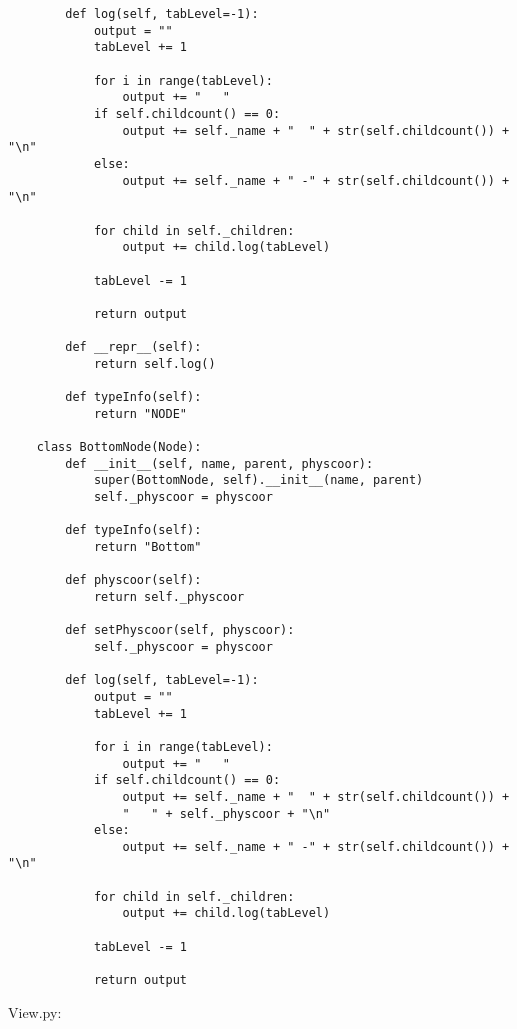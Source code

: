 \begin{verbatim}
        def log(self, tabLevel=-1):
            output = ""
            tabLevel += 1
    
            for i in range(tabLevel):
                output += "   "
            if self.childcount() == 0:
                output += self._name + "  " + str(self.childcount()) + "\n"
            else:
                output += self._name + " -" + str(self.childcount()) + "\n"
    
            for child in self._children:
                output += child.log(tabLevel)
    
            tabLevel -= 1
    
            return output
    
        def __repr__(self):
            return self.log()
    
        def typeInfo(self):
            return "NODE"
    
    class BottomNode(Node):
        def __init__(self, name, parent, physcoor):
            super(BottomNode, self).__init__(name, parent)
            self._physcoor = physcoor
    
        def typeInfo(self):
            return "Bottom"
    
        def physcoor(self):
            return self._physcoor
    
        def setPhyscoor(self, physcoor):
            self._physcoor = physcoor
    
        def log(self, tabLevel=-1):
            output = ""
            tabLevel += 1
    
            for i in range(tabLevel):
                output += "   "
            if self.childcount() == 0:
                output += self._name + "  " + str(self.childcount()) + 
                "   " + self._physcoor + "\n"
            else:
                output += self._name + " -" + str(self.childcount()) + "\n"
    
            for child in self._children:
                output += child.log(tabLevel)
    
            tabLevel -= 1
    
            return output
\end{verbatim}

View.py:


